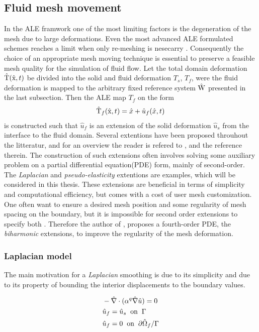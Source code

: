 \subsection{Fluid mesh movement}
In the ALE framwork one of the most limiting factors is the degeneration of the mesh due to large deformations. Even the most advanced ALE formulated schemes reaches a limit when only re-meshing is nesecarry \cite{Wall12006}. Consequently the choice of an appropriate mesh moving technique is essential to preserve a feasible mesh quality for the simulation of fluid flow. Let the total domain deformation $\text{\^{T}}(\text{\^{x}}, t)$ be divided into the solid and fluid deformation $T_s$, $T_f$, were the fluid deformation is mapped to the arbitrary fixed reference system $\text{\^{W}}$ presented in the last subsection.  
Then the ALE map $T_f$ on the form 
\begin{align*}
\text{\^{T}}_f(\text{\^{x}}, t) = \hat{x} + \hat{u}_f(\hat{x}, t)
\end{align*}
is constructed such that $\hat{u}_f$ is an extension of the solid deformation $\hat{u}_s$ from the interface to the fluid domain. Several extentions have been proposed throuhout the litteratur, and for an overview the reader is refered to \cite{MM2016}, and the reference therein. The construction of such extensions often involves solving some auxiliary problem on a partial differential equation(PDE) form, mainly of second-order. The \textit{Laplacian} and \textit{pseudo-elasticity} extentions are examples, which will be considered in this thesis. These extensions are beneficial in terms of simplicity and computational efficiency, but comes with a cost of user mesh customization. One often want to ensure a desired mesh position and some regularity of mesh spacing on the boundary, but it is impossible for second order extensions to specify both \cite{Helenbrook2003}. Therefore the author of \cite{Helenbrook2003}, proposes a fourth-order PDE, the \textit{biharmonic} extensions, to improve the regularity of the mesh deformation. \\

\subsubsection*{Laplacian model}

The main motivation for a \textit{Laplacian} smoothing is due to its simplicity and due to its property of bounding the interior displacements to the boundary values. 

\begin{align*}
&- \hat{\nabla} \cdot (\alpha^q \hat{\nabla} \hat{u}) = 0 \\
&\hat{u}_f = \hat{u}_s \hspace{2mm} \text{on} \hspace{2mm}  \Gamma \\
&\hat{u}_f = 0 \hspace{2mm} \text{on} \hspace{2mm} \partial \hat{\Omega}_f / \Gamma 
\end{align*}

